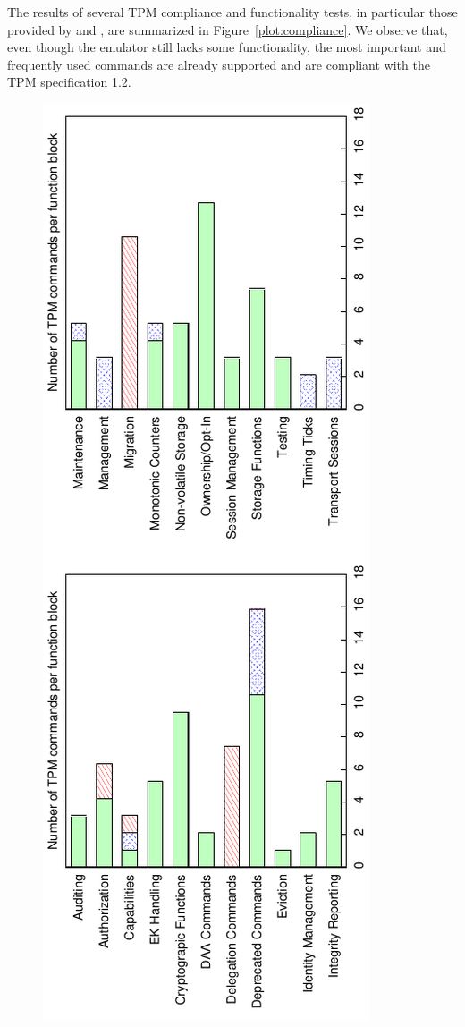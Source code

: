 \documentclass[runningheads]{llncs}
\begin{document}
The results of several TPM compliance and functionality tests, in particular those provided by
\cite{trousers,ibmdaatest} and \cite{Sadeghi}, are summarized in Figure~\ref{plot:compliance}.
We observe that, even though the emulator still lacks some functionality, the most important and
frequently used commands are already supported and are compliant with the TPM specification 1.2.

\begin{figure}[h]
\centering
\includegraphics[angle=-90,scale=0.8]{plots/compliance}

\end{figure}
\end{document}
